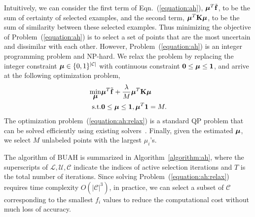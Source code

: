 Intuitively, we can consider the first term of Eqn.~(\ref{equation:ah}), $\mbox{\boldmath$\mu$\unboldmath}^T\tilde{{\bf f}}$, to be the sum of certainty of selected examples, and the second term, $\mbox{\boldmath$\mu$\unboldmath}^T{\bf K}\mbox{\boldmath$\mu$\unboldmath}$, to be the sum of similarity between these selected examples. Thus minimizing the objective of Problem~(\ref{equation:ah}) is to select a set of points that are the most uncertain and dissimilar with each other. However, Problem~(\ref{equation:ah}) is an integer programming problem and NP-hard. We relax the problem by replacing the integer constraint $\mbox{\boldmath$\mu$\unboldmath}\in \{0,1\}^{|\mathcal{C}|}$ with continuous constraint ${\bf 0}\le\mbox{\boldmath$\mu$\unboldmath}\le{\bf 1}$, and arrive at the following optimization problem,
 \begin{eqnarray}
 \label{equation:ah:relax}
\min_{\mbox{\boldmath$\mu$\unboldmath}}&\mbox{\boldmath$\mu$\unboldmath}^T\tilde{{\bf f}}+\frac{\lambda}{M}\mbox{\boldmath$\mu$\unboldmath}^T{\bf K}\mbox{\boldmath$\mu$\unboldmath}\\
 \mathop{\rm s.t.}& {\bf 0}\le\mbox{\boldmath$\mu$\unboldmath}\le{\bf 1},\mbox{\boldmath$\mu$\unboldmath}^T{\bf 1}=M.\nonumber
 \end{eqnarray}
The optimization problem~(\ref{equation:ah:relax}) is a standard \mbox{QP} problem that can be solved efficiently using existing solvers~\cite{boyd2004convex}. Finally, given the estimated $\mbox{\boldmath$\mu$\unboldmath}$, we select $M$ unlabeled points with the largest $\mu_i$'s.

The algorithm of \mbox{BUAH} is summarized in Algorithm~\ref{algorithm:ah}, where the superscripts of $\mathcal{L}, \mathcal{U}, \mathcal{C}$ indicate the indices of active selection iterations and $T$ is the total number of iterations. Since solving Problem~(\ref{equation:ah:relax}) requires time complexity $O(|\mathcal{C}|^3)$, in practice, we can select a subset of $\mathcal{C}$ corresponding to the smallest $f_i$ values to reduce the computational cost without much loss of accuracy.


